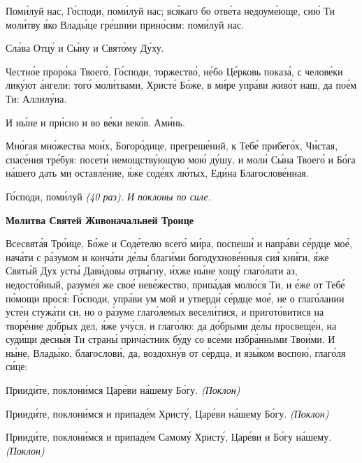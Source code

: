   Поми́луй нас, Го́споди, поми́луй нас; вся́каго бо отве́та недоуме́юще, сию́
Ти моли́тву я́ко Влады́це гре́шнии прино́сим: поми́луй нас.



   Сла́ва Отцу́ и Сы́ну и Свято́му Ду́ху.


   Честно́е проро́ка Твоего́, Го́споди, торжество́, не́бо Це́рковь показа́, с
челове́ки лику́ют а́нгели: того́ моли́твами, Христе́ Бо́же, в ми́ре упра́ви
живо́т наш, да пое́м Ти: Аллилу́иа.


   И ны́не и при́сно и во ве́ки веко́в. Ами́нь.


   Мно́гая мно́жества мои́х, Богоро́дице, прегреше́ний, к Тебе́ прибего́х,
Чи́стая, спасе́ния тре́буя: посети́ немощству́ющую мою́ ду́шу, и моли́ Сы́на
Твоего́ и Бо́га на́шего дать ми оставле́ние, я́же соде́ях лю́тых, Еди́на
Благослове́нная.


   Го́споди, поми́луй \itshape (40 раз). И поклоны по силе.\normalfont{}



 

\bfseries Молитва Святей Живоначальней Троице\normalfont{}


   Всесвята́я Тро́ице, Бо́же и Соде́телю всего́ ми́ра, поспеши́ и напра́ви
се́рдце мое́, нача́ти с ра́зумом и конча́ти де́лы благи́ми богодухнове́нныя сия́
кни́ги, я́же Святы́й Дух усты́ Дави́довы отры́гну, и́хже ны́не хощу́
глаго́лати аз, недосто́йный, разуме́я же свое́ неве́жество, припа́дая
молю́ся Ти, и е́же от Тебе́ по́мощи прося́: Го́споди, упра́ви ум мой и
утверди́ се́рдце мое́, не о глаго́лании усте́н стужа́ти си, но о ра́зуме
глаго́лемых весели́тися, и пригото́витися на творе́ние до́брых дел, я́же
учу́ся, и глаго́лю: да до́брыми де́лы просвеще́н, на суди́щи десны́я
Ти страны́ прича́стник бу́ду со все́ми избра́нными Твои́ми. И ны́не,
Влады́ко, благослови́, да, воздохну́в от се́рдца, и язы́ком воспою́, глаго́ля
си́це:


   Прииди́те, поклони́мся Царе́ви на́шему Бо́гу. \itshape (Поклон)\normalfont{}


   Прииди́те, поклони́мся и припаде́м Христу́, Царе́ви на́шему Бо́гу.
\itshape (Поклон)\normalfont{}


   Прииди́те, поклони́мся и припаде́м Самому́ Христу́, Царе́ви и Бо́гу
на́шему. \itshape (Поклон)\normalfont{}




